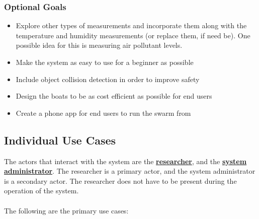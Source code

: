 \documentclass[11pt]{article}
\begin{document}
\subsubsection{Optional Goals}
\begin{itemize}
    \item Explore other types of measurements and incorporate them along with the temperature and humidity measurements (or replace them, if need be). One possible idea for this is measuring air pollutant levels.
    \item Make the system as easy to use for a beginner as possible 
    \item Include object collision detection in order to improve safety 
    \item Design the boats to be as cost efficient as possible for end users 
    \item Create a phone app for end users to run the swarm from
\end{itemize}

\subsection{Individual Use Cases}

The actors that interact with the system are the \textbf{\hyperref[sec:definitions]{researcher}}, and the \textbf{\hyperref[sec:definitions]{system administrator}}. The researcher is a primary actor, and the system administrator is a secondary actor. The researcher does not have to be present during the operation of the system. \\\\
The following are the primary use cases:
\end{document}

